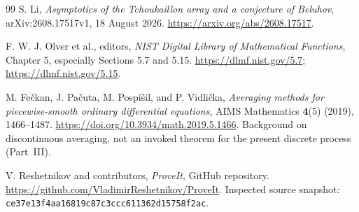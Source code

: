 \begin{thebibliography}{99}
S. Li, \emph{Asymptotics of the Tchoukaillon array and a conjecture
of Beluhov}, arXiv:2608.17517v1, 18 August 2026.
\url{https://arxiv.org/abs/2608.17517}.

F. W. J. Olver et al., editors,
\emph{NIST Digital Library of Mathematical Functions},
Chapter 5, especially Sections 5.7 and 5.15.
\url{https://dlmf.nist.gov/5.7};
\url{https://dlmf.nist.gov/5.15}.

M. Fe\v{c}kan, J. Pa\v{c}uta, M. Posp\'i\v{s}il, and P. Vidli\v{c}ka,
\emph{Averaging methods for piecewise-smooth ordinary differential equations},
AIMS Mathematics \textbf{4}(5) (2019), 1466--1487.
\url{https://doi.org/10.3934/math.2019.5.1466}.
Background on discontinuous averaging, not an invoked theorem for
the present discrete process (Part~III).

V. Reshetnikov and contributors,
\emph{ProveIt}, GitHub repository.
\url{https://github.com/VladimirReshetnikov/ProveIt}.
Inspected source snapshot:
\texttt{ce37e13f4aa16819c87c3ccc611362d15758f2ac}.

\end{thebibliography}
